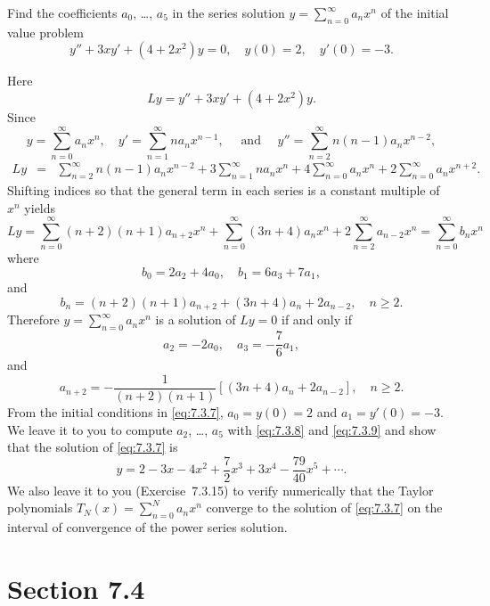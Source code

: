 \setcounter{example}{2}
\setcounter{equation}{6}
\begin{example}
  \label{example:7.3.3} \rm Find the coefficients $a_{0}$, \dots, $a_{5}$ in the series solution
  $y=\sum^{\infty}_{n=0}a_{n}x^{n}$ of the initial value problem
  \begin{equation}
    \label{eq:7.3.7}y''+3xy'+(4+2x^{2})y=0,\quad y(0)=2,\quad y'(0)=-3.
  \end{equation}
\end{example}
\setcounter{equation}{7}
\begin{examplesolution}
\solution Here
\[
  Ly=y''+3xy'+(4+2x^{2})y.
\]
Since
\[
  y=\sum^{\infty}_{n=0}a_{n}x^{n},\quad y'=\sum^{\infty}_{n=1}n a_{n}x^{n-1},\quad\mbox{ and }\quad y''=\sum^{\infty}_{n=2}n(n-1)a_{n}x^{n-2},
\]
\begin{eqnarray*}
  Ly & = & \sum^{\infty}_{n=2}n(n-1)a_{n}x^{n-2}+3\sum^{\infty}_{n=1}na_{n}x^{n}+4\sum^{\infty}_{n=0}a_{n}x^{n}+2\sum^{\infty}_{n=0}a_{n}x^{n+2}.
\end{eqnarray*}
Shifting indices so that the general term in each series is a constant multiple of $x^{n}$ yields
\[
  Ly=\sum^{\infty}_{n=0}(n+2)(n+1)a_{n+2}x^{n}+\sum^{\infty}_{n=0}(3n+4)a_{n}x^{n}+2\sum^{\infty}_{n=2}a_{n-2}x^{n}=\sum_{n=0}^{\infty}b_{n}x^{n}
\]
where
\[
  b_{0}=2a_{2}+4a_{0},\quad b_{1}=6a_{3}+7a_{1},
\]
and
\[
  b_{n}=(n+2)(n+1)a_{n+2}+(3n+4)a_{n}+2a_{n-2},\quad n\ge2.
\]
Therefore $y=\sum^{\infty}_{n=0}a_{n}x^{n}$ is a solution of $Ly=0$ if and only if
\begin{equation}
  \label{eq:7.3.8}a_{2}=-2a_{0},\quad a_{3}=-\frac{7}{6}a_{1},
\end{equation}
and
\begin{equation}
  \label{eq:7.3.9}a_{n+2}=-\frac{1}{(n+2)(n+1)}\left[(3n+4)a_{n}+2a_{n-2}\right],\quad n\ge2.
\end{equation}
From the initial conditions in \eqref{eq:7.3.7}, $a_{0}=y(0)=2$ and $a_{1}=y'(0)=-3$. We leave it to
you to compute $a_{2}$, \dots, $a_{5}$ with \eqref{eq:7.3.8} and \eqref{eq:7.3.9} and show that the
solution of \eqref{eq:7.3.7} is
\[
  y=2-3x-4x^{2}+\frac{7}{2}x^{3}+3x^{4}-\frac{79}{40}x^{5}+\cdots.
\]
We also leave it to you (Exercise~7.3.15) to verify numerically that the Taylor
polynomials $T_{N}(x)=\sum_{n=0}^{N}a_{n}x^{n}$ converge to the solution of \eqref{eq:7.3.7} on the
interval of convergence of the power series solution.
\end{examplesolution}

\section*{Section 7.4}
\setcounter{chapter}{7}
\setcounter{section}{4}

